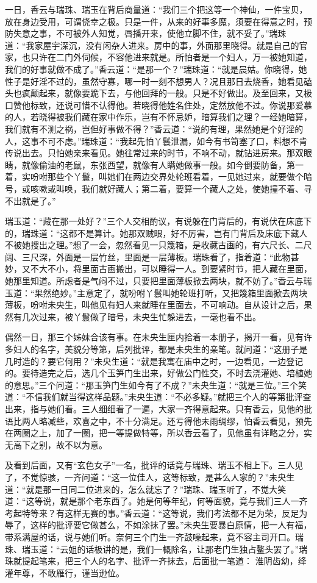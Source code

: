 \documentclass[a4paper,12pt,UTF8,twoside]{ctexbook}
\begin{document}
一日，香云与瑞珠、瑞玉在背后商量道：“我们三个把这等一个神仙，一件宝贝，放在身边受用，可谓侥幸之极。只是一件，从来的好事多魔，须要在得意之时，预防失意之事，不可被外人知觉，唇播开来，使他立脚不住，就不妥了。”瑞珠道：“我家屋宇深沉，没有闲杂人进来。房中的事，外面那里晓得。就是自己的官家，也只许在二门外伺候，不容他进来就是。所怕者是一个妇人，万一被她知道，我们的好事就做不成了。”香云道：“是那一个？”瑞珠道：“就是晨姑。你晓得，她性子是好淫不过的，虽然守寡，哪一时一刻不想男人？况且那日去烧香，她看见磕头也疯颠起来，就像要跪下去，与他回拜的一般。只是不好做出。及至回来，又极口赞他标致，还说可惜不认得他。若晓得他姓名住处，定然放他不过。你说那爱慕的人，若晓得被我们藏在家中作乐，岂有不怀忌妒，暗算我们之理？一经她暗算，我们就有不测之祸，岂但好事做不得？”香云道：“说的有理，果然她是个好淫的人，这事不可不虑。”瑞珠道：“我起先怕丫鬟泄漏，如今有书笥塞了口，料想不肯传说出去。只怕她亲来看见。她往常过来的时节，不响不动，就钻进房来。那双眼睛，就像偷油的老鼠，东张西望，就像有人瞒她做事一般。如今倒要防备，第一着，实吩咐那些个丫鬟，叫她们在两边交界处轮班看着，一见她过来，就要做个暗号，或咳嗽或叫唤，我们就好藏人；第二着，要算一个藏人之处，使她撞不着、寻不出就是了。”

瑞玉道：“藏在那一处好？”三个人交相酌议，有说躲在门背后的，有说伏在床底下的，瑞珠道：“这都不是算计。她那双贼眼，好不厉害，岂有门背后及床底下藏人不被她搜出之理。”想了一会，忽然看见一只篾箱，是收藏古画的，有六尺长、二尺阔、三尺深，外面是一层竹丝，里面是一层薄板。瑞珠看了，指着道：“此物甚妙，又不大不小，将里面古画搬出，可以睡得一人。到要紧时节，把人藏在里面，她那里知道。所虑者是气闷不过，只要把里面薄板掀去两块，就不妨了。”香云与瑞玉道：“果然绝妙。”主意定了，就吩咐丫鬟叫她轮班打听，又把篾箱里面掀去两块薄板，吩咐未央生，叫他见有妇人来就睡在里面去，不可响动。自从设计之后，果然有几次过来，被丫鬟做了暗号，未央生忙躲进去，一毫也看不出。

偶然一日，那三个姊妹合该有事。在未央生匣内拾着一本册子，揭开一看，见有许多妇人的名字，美貌分等第，后列批评，都是未央生的亲笔。就问道：“这册子是几时造的？要它何用？”未央生道：“就是我寓在庙中之时，一边看见，一边登记的。要待造完之后，选几个玉笋门生出来，好做公门性交，不时去浇灌她、培植她的意思。”三个问道：“那玉笋门生如今有了不成？”未央生道：“就是三位。”三个笑道：“不信我们就当得这样品题。”未央生道：“不必多疑。”就把三个人的等第批评查出来，指与她们看。三人细细看了一遍，大家一齐得意起来。只有香云，见他的批语比两人略减些，欢喜之中，不十分满足。还亏得他未雨绸缪，怕香云看见，预先在两圈之上，加了一圈，把一等提做特等，所以香云看了，见他虽有详略之分，实无高下之别，故不以为意。

及看到后面，又有“玄色女子”一名，批评的话竟与瑞珠、瑞玉不相上下。三人见了，不觉惊骇，一齐问道：“这一位佳人，这等标致，是甚么人家的？”未央生道：“就是那一日同二位进来的，怎么就忘了？”瑞珠、瑞玉听了，不觉大笑道：“这等说，就是那个老东西了。她是何等年纪，何等面貌，竟与我们三人一齐考起特等来？有这样无赛的事。”香云道：“这等说，我们考法都不足为荣，反足为辱了，这样的批评要它做甚么，不如涂抹了罢。”未央生要暴白原情，把一人有福，带系满屋的话，说与她们听。奈何三个门生一齐鼓噪起来，竟不容主司开口。瑞珠、瑞玉道：“云姐的话极讲的是，我们一概除名，让那老门生独占鳌头罢了。”瑞珠就提起笔来，把三个人的名字、批评一齐抹去，后面批一笔道：
淮阴齿幼，绛灌年尊，不敢雁行，谨当逊位。
\end{document}
